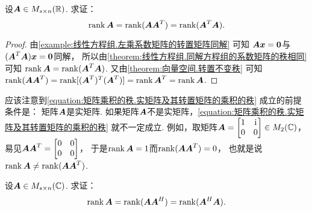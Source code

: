 \begin{example}
设\(\boldsymbol{A} \in M_{s \times n}(\mathbb{R})\).
求证：\begin{equation}\label{equation:矩阵乘积的秩.实矩阵及其转置矩阵的乘积的秩}
	\rank\boldsymbol{A} = \rank(\boldsymbol{A} \boldsymbol{A}^T) = \rank(\boldsymbol{A}^T \boldsymbol{A}).
\end{equation}
\begin{proof}
由\cref{example:线性方程组.左乘系数矩阵的转置矩阵同解} 可知
\(\boldsymbol{A} \boldsymbol{x} = \boldsymbol0\)与\((\boldsymbol{A}^T \boldsymbol{A}) \boldsymbol{x} = \boldsymbol0\)同解，
所以由\cref{theorem:线性方程组.同解方程组的系数矩阵的秩相同} 可知
\(\rank\boldsymbol{A} = \rank(\boldsymbol{A}^T \boldsymbol{A})\).
又由\cref{theorem:向量空间.转置不变秩} 可知
\(\rank(\boldsymbol{A} \boldsymbol{A}^T)
= \rank[(\boldsymbol{A}^T)^T (\boldsymbol{A}^T)]
= \rank\boldsymbol{A}^T
= \rank\boldsymbol{A}\).
\end{proof}
\end{example}
\begin{remark}
应该注意到\cref{equation:矩阵乘积的秩.实矩阵及其转置矩阵的乘积的秩} 成立的前提条件是：
矩阵\(\boldsymbol{A}\)是实矩阵.
如果矩阵\(\boldsymbol{A}\)不是实矩阵，\cref{equation:矩阵乘积的秩.实矩阵及其转置矩阵的乘积的秩} 就不一定成立.
例如，取矩阵\(\boldsymbol{A} = \begin{bmatrix}
	1 & \kern1pt\mathrm{i}\kern1pt \\
	0 & 0
\end{bmatrix}
\in M_2(\mathbb{C})\)，
易见\(\boldsymbol{A} \boldsymbol{A}^T = \begin{bmatrix}
	0 & 0 \\
	0 & 0
\end{bmatrix}\)，
于是\(\rank\boldsymbol{A}=1\)而\(\rank(\boldsymbol{A}\boldsymbol{A}^T)=0\)，
也就是说\(\rank\boldsymbol{A}\neq\rank(\boldsymbol{A}\boldsymbol{A}^T)\).
\end{remark}
\begin{example}
设\(\boldsymbol{A} \in M_{s \times n}(\mathbb{C})\).
求证：\begin{equation}\label{equation:矩阵乘积的秩.复矩阵及其共轭转置矩阵的乘积的秩}
	\rank\boldsymbol{A} = \rank(\boldsymbol{A} \boldsymbol{A}^H) = \rank(\boldsymbol{A}^H \boldsymbol{A}).
\end{equation}
\end{example}

